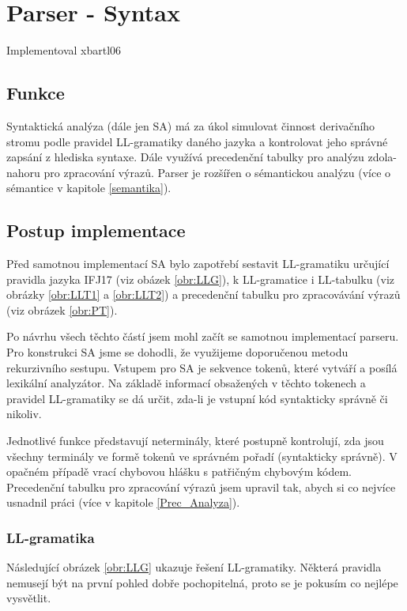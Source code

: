 \documentclass[11pt,a4paper]{article}
\begin{document}
	\newpage


\section{Parser - Syntax}
    Implementoval xbartl06

    \subsection{Funkce}
    Syntaktická analýza (dále jen SA) má za úkol simulovat činnost derivačního stromu podle pravidel LL-gramatiky daného jazyka a kontrolovat jeho správné zapsání z hlediska syntaxe. Dále využívá precedenční tabulky pro analýzu zdola-nahoru pro zpracování výrazů. Parser je rozšířen o sémantickou analýzu (více o sémantice v kapitole \ref{semantika}).


    \subsection{Postup implementace}
    Před samotnou implementací SA bylo zapotřebí sestavit LL-gramatiku určující pravidla jazyka IFJ17 (viz obázek \ref{obr:LLG}), k LL-gramatice i LL-tabulku (viz obrázky \ref{obr:LLT1} a \ref{obr:LLT2}) a precedenční tabulku pro zpracovávání výrazů (viz obrázek \ref{obr:PT}).

    Po návrhu všech těchto částí jsem mohl začít se samotnou implementací parseru. Pro konstrukci SA jsme se dohodli, že využijeme doporučenou metodu rekurzivního sestupu. Vstupem pro SA je sekvence tokenů, které vytváří a posílá lexikální analyzátor. Na základě informací obsažených v těchto tokenech a pravidel LL-gramatiky se dá určit, zda-li je vstupní kód syntakticky správně či nikoliv.

    Jednotlivé funkce představují neterminály, které postupně kontrolují, zda jsou všechny terminály ve formě tokenů ve správném pořadí (syntakticky správně). V opačném případě vrací chybovou hlášku s patřičným chybovým kódem. Precedenční tabulku pro zpracování výrazů jsem upravil tak, abych si co nejvíce usnadnil práci (více v kapitole \ref{Prec_Analyza}).


        \subsubsection{LL-gramatika} \label{LL_Gramatika}

        Následující obrázek \ref{obr:LLG} ukazuje řešení LL-gramatiky. Některá pravidla nemusejí být na první pohled dobře pochopitelná, proto se je pokusím co nejlépe vysvětlit.
\end{document}
